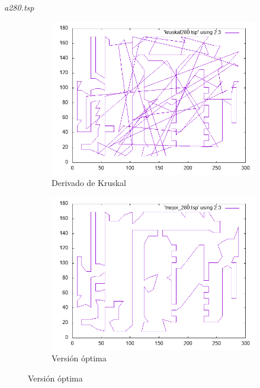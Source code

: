 \documentclass{beamer}
\begin{document}
\begin{frame}[fragile]{\textit{a280.tsp}}
\begin{figure}[H]
\begin{subfigure}[b]{0.36\textwidth}
\includegraphics[width=\textwidth]{a280_kruskal.png}
\caption*{\small{Derivado de Kruskal}}
\end{subfigure}
\quad
\begin{subfigure}[b]{0.36\textwidth}
\includegraphics[width=\textwidth]{a280_mejor.png}
\caption*{\small{Versión óptima}}
\end{subfigure}
\end{figure}

\end{frame}

\end{document}
